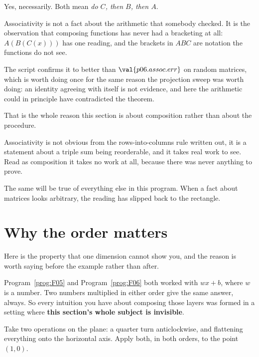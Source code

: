 \begin{fr}
\begin{ansblock}
Yes, necessarily. Both mean \emph{do $C$, then $B$, then $A$}.
\end{ansblock}

Associativity is not a fact about the arithmetic that somebody checked. It is
the observation that composing functions has never had a bracketing at all:
$A(B(C(x)))$ has one reading, and the brackets in $ABC$ are notation the
functions do not see.

The script confirms it to better than $\val{p06.assoc.err}$ on random
matrices, which is
worth doing once for the same reason the projection sweep was worth doing: an
identity agreeing with itself is not evidence, and here the arithmetic could in
principle have contradicted the theorem.
\end{fr}

\begin{fr}
\begin{note}
That is the whole reason this section is about composition rather than about
the procedure.

Associativity is not obvious from the rows-into-columns rule \dash{} written
out, it is a statement about a triple sum being reorderable, and it takes real
work to see. Read as composition it takes no work at all, because there was
never anything to prove.

The same will be true of everything else in this program. When a fact about
matrices looks arbitrary, the reading has slipped back to the rectangle.
\end{note}
\end{fr}

\section{Why the order matters}
\label{sec:P06-order}

\begin{fr}
Here is the property that one dimension cannot show you, and the reason is
worth saying before the example rather than after.

Program~\ref{prog:F05} and Program~\ref{prog:F06} both worked with $wx + b$,
where $w$ is a number. Two numbers multiplied in either order give the same
answer, always. So every intuition you have about composing those layers was
formed in a setting where \textbf{this section's whole subject is
invisible}.

Take two operations on the plane: a quarter turn anticlockwise, and flattening
everything onto the horizontal axis. Apply both, in both orders, to the point
$(1, 0)$.
\dotline
\nextframe
\end{fr}

